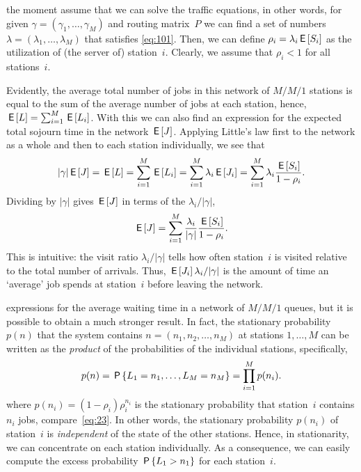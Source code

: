\documentclass[stochastic-or.tex]{subfiles}
\begin{document}
 the moment assume that we can solve the traffic equations, in other words, for given $\gamma =(\gamma_1, \ldots, \gamma_M)$ and routing matrix~$P$ we can find a set of numbers $\lambda =(\lambda_1, \ldots, \lambda_M)$  that satisfies \cref{eq:101}.
Then, we can define $\rho_i = \lambda_i \,\mathsf{E}\left[S_i\right]$ as the utilization of (the server of) station~$i$.
Clearly, we assume that $\rho_i < 1$ for all stations~$i$.

Evidently, the average total number of jobs in this network of $M/M/1$ stations is equal to the sum of the average number of jobs at each station, hence,
$\,\mathsf{E}\left[L\right] = \sum_{i=1}^M \,\mathsf{E}\left[L_i\right]$.
With this we can also find an expression for the expected total sojourn time in the network $\,\mathsf{E}\left[J\right]$.
Applying Little's law first to the network as a whole and then to each station individually, we see that
\begin{equation*}
  |\gamma| \,\mathsf{E}\left[J\right] = \,\mathsf{E}\left[L\right] = \sum_{i=1}^M \,\mathsf{E}\left[L_i\right] = \sum_{i=1}^M \lambda_i \,\mathsf{E}\left[J_i\right] = \sum_{i=1}^M \lambda_i \frac{\,\mathsf{E}\left[S_i\right]}{1-\rho_i}.
\end{equation*}
Dividing by $|\gamma|$ gives  $\,\mathsf{E}\left[J\right]$  in terms of the  $\lambda_i/|\gamma|$,
\begin{equation*}
 \,\mathsf{E}\left[J\right] = \sum_{i=1}^M \frac{\lambda_i}{|\gamma|} \frac{\,\mathsf{E}\left[S_i\right]}{1-\rho_i}.
\end{equation*}
This is intuitive: the visit ratio $\lambda_i/|\gamma|$ tells how often station~$i$ is visited relative to the total number of arrivals.
Thus, $\,\mathsf{E}\left[J_i\right] \lambda_i /|\gamma|$ is the amount of time an `average' job spends at station~$i$ before leaving the network.

 expressions for the average waiting time in a network of $M/M/1$ queues, but it is possible to obtain a much stronger result.
In fact, the stationary probability $p(n)$ that the system contains $n=(n_1,n_2, \ldots, n_M)$ at stations $1,\ldots, M$ can be written as the \emph{product} of the probabilities of the individual stations, specifically,
\begin{equation*}
p(n) =  \P{\L_1=n_1, \ldots, \L_M=n_M}  = \prod_{i=1}^M p(n_i). %
\end{equation*}
where $p(n_i)=(1-\rho_i)\rho_i^{n_i}$ is the stationary probability that station~$i$ contains $n_i$ jobs, compare~\cref{eq:23}.
In other words, the stationary probability $p(n_i)$ of station~$i$ is \emph{independent} of the state of the other stations. Hence, in stationarity, we can concentrate on each station individually. As a consequence, we can easily compute the excess probability $\,\mathsf{P}\left\{L_1> n_1\right\}$ for each station~$i$.
\end{document}
